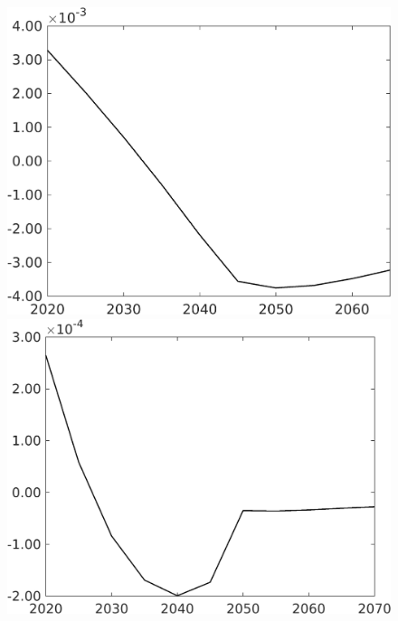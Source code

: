 \begin{figure}[h!!!]
\begin{minipage}[]{0.32\textwidth}
	\end{minipage}
	\begin{minipage}[]{0.32\textwidth}
		\includegraphics[width=1\textwidth]{../../codding_model/own_basedOnFried/optimalPol_010922_revision/figures/all_13Sept22_Tplus30/gAn_OPT_COMPtaulPer_regime4_spillover0_knspil0_noskill0_sep0_xgrowth0_PV1_etaa0.79.png}
	\end{minipage}
	\begin{minipage}[]{0.32\textwidth}
		\includegraphics[width=1\textwidth]{../../codding_model/own_basedOnFried/optimalPol_010922_revision/figures/all_13Sept22_Tplus30/SWF_OPT_COMPtaulPer_regime4_spillover0_knspil0_noskill0_sep0_xgrowth0_PV1_etaa0.79.png}
	\end{minipage}
\end{figure} 


